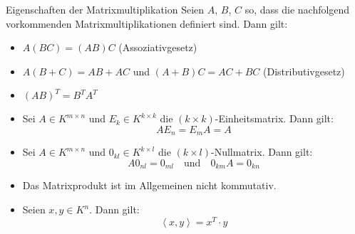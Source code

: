 \documentclass[german]{../spicker}
\newcommand{\scalarprod}[1]{\left\langle #1 \right\rangle}
\begin{document}
\begin{defi}{Eigenschaften der Matrixmultiplikation}
    Seien $A$, $B$, $C$ so, dass die nachfolgend vorkommenden Matrixmultiplikationen definiert sind.
    Dann gilt:
    \begin{itemize}
        \item $A(BC) = (AB)C$ (Assoziativgesetz)
        \item $A(B+C) = AB+AC$ und $(A+B)C = AC+BC$ (Distributivgesetz)
        \item $(AB)^T = B^TA^T$
        \item Sei $A \in K^{m\times n}$ und $E_k \in K^{k\times k}$ die $(k\times k)$-Einheitsmatrix. Dann gilt:
              $$
                  AE_n = E_mA = A
              $$
        \item Sei $A \in K^{m\times n}$ und $0_{kl} \in K^{k\times l}$ die $(k\times l)$-Nullmatrix. Dann gilt:
              $$
                  A0_{nl} = 0_{ml} \quad \text{und} \quad 0_{km}A = 0_{kn}
              $$
        \item Das Matrixprodukt ist im Allgemeinen nicht kommutativ.
        \item Seien $x, y \in K^n$. Dann gilt:
              $$
                  \scalarprod{x, y} = x^T \cdot y
              $$
    \end{itemize}
\end{defi}
\end{document}
